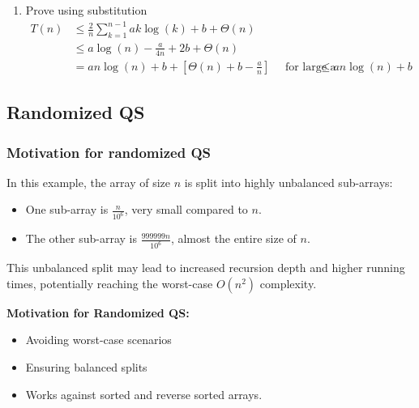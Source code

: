 \begin{derivation}
\begin{enumerate}
            \item Prove using substitution
            \begin{align*}
                T(n) &\leq \frac{2}{n} \sum_{k=1}^{n-1} a k \log(k) + b + \Theta(n) \\
                &\leq a \log(n) - \frac{a}{4n} + 2b + \Theta(n) \\
                &= a n \log(n) + b + \left[\Theta(n) + b - \frac{a}{n} \right] \quad \text{ for large a}
                &\leq an \log(n) + b
            \end{align*}
        \end{enumerate}
    \end{derivation}

\subsection{Randomized QS} 
    \subsubsection{Motivation for randomized QS}
    \begin{example}
        \begin{center}
        \end{center}
        
        \noindent In this example, the array of size \( n \) is split into highly unbalanced sub-arrays:
        \begin{itemize}
            \item One sub-array is \( \frac{n}{10^6} \), very small compared to \( n \).
            \item The other sub-array is \( \frac{999999n}{10^6} \), almost the entire size of \( n \).
        \end{itemize}
        \vspace{1em}

        \noindent This unbalanced split may lead to increased recursion depth and higher running times, potentially reaching the worst-case \( O(n^2) \) complexity.
        \vspace{1em}

        \textbf{Motivation for Randomized QS:}
        \begin{itemize}
            \item Avoiding worst-case scenarios
            \item Ensuring balanced splits
            \item Works against sorted and reverse sorted arrays.
        \end{itemize}
    \end{example}

